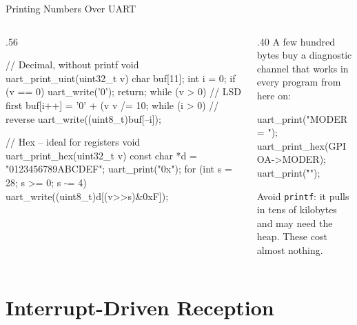 \documentclass[9pt,aspectratio=169,xcolor=table]{beamer}
\begin{document}
\begin{frame}[fragile]{Printing Numbers Over UART}
    \begin{columns}[c]
    \begin{column}{.56\textwidth}
        \begin{cc}[basicstyle=\scriptsize\ttfamily]
// Decimal, without printf
void uart_print_uint(uint32_t v)
{
  char buf[11]; int i = 0;
  if (v == 0) {
    uart_write('0'); return;
  }
  while (v > 0) {       // LSD first
    buf[i++] = '0' + (v %
    v /= 10;
  }
  while (i > 0) {       // reverse
    uart_write((uint8_t)buf[--i]);
  }
}

// Hex -- ideal for registers
void uart_print_hex(uint32_t v)
{
  const char *d = "0123456789ABCDEF";
  uart_print("0x");
  for (int s = 28; s >= 0; s -= 4) {
    uart_write((uint8_t)d[(v>>s)&0xF]);
  }
}
\end{cc}
    \end{column}
    \begin{column}{.40\textwidth}
        {\small A few hundred bytes buy a diagnostic channel that works in
        every program from here on:}

        \begin{cc}[basicstyle=\scriptsize\ttfamily]
uart_print("MODER = ");
uart_print_hex(GPIOA->MODER);
uart_print("\r\n");
\end{cc}

        \vspace{2mm}
        {\small \alert{Avoid \texttt{printf}}: it pulls in tens of kilobytes
        and may need the heap. These cost almost nothing.}
    \end{column}
    \end{columns}
\end{frame}


\section{Interrupt-Driven Reception}
\end{document}
